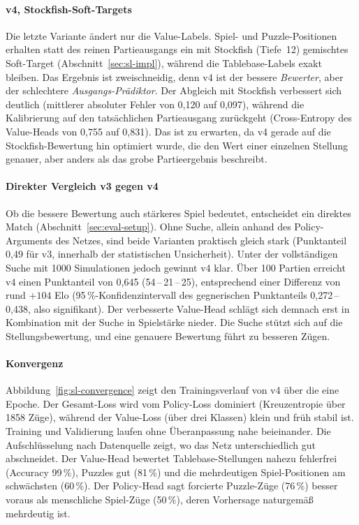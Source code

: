 \documentclass[
  a4paper, 12pt,
  parskip=half,
  headings=small,
  bibliography=totoc
]{scrartcl}
\begin{document}
\paragraph{v4, Stockfish-Soft-Targets}
Die letzte Variante ändert nur die Value-Labels. Spiel- und Puzzle-Positionen
erhalten statt des reinen Partieausgangs ein mit Stockfish (Tiefe~12) gemischtes
Soft-Target (Abschnitt~\ref{sec:sl-impl}), während die Tablebase-Labels exakt
bleiben. Das Ergebnis ist zweischneidig, denn v4 ist der bessere \emph{Bewerter}, aber der
schlechtere \emph{Ausgangs-Prädiktor}. Der Abgleich mit Stockfish verbessert sich
deutlich (mittlerer absoluter Fehler von 0{,}120 auf 0{,}097), während die
Kalibrierung auf den tatsächlichen Partieausgang zurückgeht (Cross-Entropy des
Value-Heads von 0{,}755 auf 0{,}831). Das ist
zu erwarten, da v4 gerade auf die Stockfish-Bewertung hin optimiert wurde, die den
Wert einer einzelnen Stellung genauer, aber anders als das grobe Partieergebnis
beschreibt.

\paragraph{Direkter Vergleich v3 gegen v4}
Ob die bessere Bewertung auch stärkeres Spiel bedeutet, entscheidet ein direktes
Match (Abschnitt~\ref{sec:eval-setup}). Ohne Suche, allein anhand des
Policy-Arguments des Netzes, sind beide Varianten praktisch gleich stark
(Punktanteil 0{,}49 für v3, innerhalb der statistischen Unsicherheit). Unter der
vollständigen Suche mit 1000 Simulationen jedoch gewinnt v4 klar. Über 100 Partien
erreicht v4 einen Punktanteil von 0{,}645 (54\,--\,21\,--\,25), entsprechend einer
Differenz von rund \(+104\) Elo (95\,\%-Konfidenzintervall des gegnerischen
Punktanteils 0{,}272\,--\,0{,}438, also signifikant). Der verbesserte Value-Head
schlägt sich demnach erst in Kombination mit der Suche in Spielstärke nieder. Die
Suche stützt sich auf die Stellungsbewertung, und eine genauere Bewertung führt zu
besseren Zügen.

\paragraph{Konvergenz}
Abbildung~\ref{fig:sl-convergence} zeigt den Trainingsverlauf von v4 über die eine
Epoche. Der Gesamt-Loss wird vom Policy-Loss dominiert (Kreuzentropie über 1858
Züge), während der Value-Loss (über drei Klassen) klein und früh stabil ist.
Training und Validierung laufen ohne Überanpassung nahe beieinander. Die
Aufschlüsselung nach Datenquelle zeigt, wo das Netz unterschiedlich gut
abschneidet. Der Value-Head bewertet Tablebase-Stellungen nahezu fehlerfrei
(Accuracy 99\,\%), Puzzles gut (81\,\%) und die mehrdeutigen Spiel-Positionen am
schwächsten (60\,\%). Der Policy-Head sagt forcierte Puzzle-Züge (76\,\%) besser
voraus als menschliche Spiel-Züge (50\,\%), deren Vorhersage naturgemäß mehrdeutig
ist.
\end{document}
